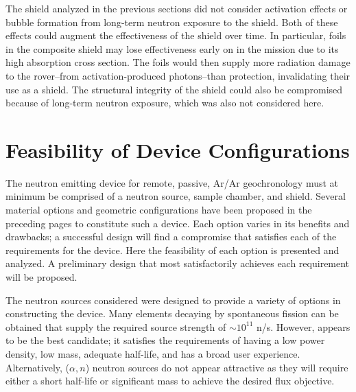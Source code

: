\documentclass{mc2015}
\begin{document}
The shield analyzed in the previous sections did not consider activation effects or bubble formation from long-term neutron exposure to the shield. Both of these effects could augment the effectiveness of the shield over time. In particular, foils in the composite shield may lose effectiveness early on in the mission due to its high absorption cross section. The foils would then supply more radiation damage to the rover--from activation-produced photons--than protection, invalidating their use as a shield. The structural integrity of the shield could also be compromised because of long-term neutron exposure, which was also not considered here.  


\section{Feasibility of Device Configurations}
\label{sec:feasibility}

The neutron emitting device for remote, passive, Ar/Ar geochronology must at minimum be comprised of a neutron source, sample chamber, and shield. Several material options and geometric configurations have been proposed in the preceding pages to constitute such a device. Each option varies in its benefits and drawbacks; a successful design will find a compromise that satisfies each of the requirements for the device. Here the feasibility of each option is presented and analyzed. A preliminary design that most satisfactorily achieves each requirement will be proposed. 

The neutron sources considered were designed to provide a variety of options in constructing the device. Many elements decaying by spontaneous fission can be obtained that supply the required source strength of $\sim10^{11}$ n/s. However,  appears to be the best candidate; it satisfies the requirements of having a low power density, low mass, adequate half-life, and has a broad user experience. Alternatively, ($\alpha,n$) neutron sources do not appear attractive as they will require either a short half-life or significant mass to achieve the desired flux objective. %
\end{document}
